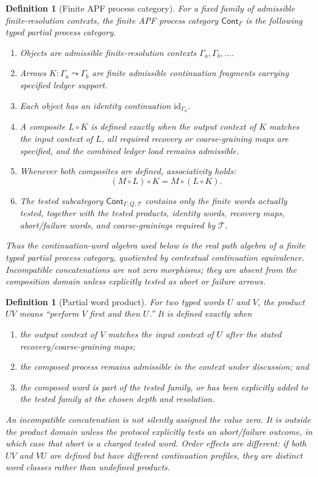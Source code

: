 \documentclass[11pt]{article}
\newtheorem{definition}[theorem]{Definition}
\begin{document}
\begin{definition}[Finite APF process category]\label{def:finite-apf-process-category}
For a fixed family of admissible finite-resolution contexts, the finite APF process category \(\mathsf{Cont}_\Gamma\) is the following typed partial process category.
\begin{enumerate}[label=(\roman*),leftmargin=2em]
\item Objects are admissible finite-resolution contexts \(\Gamma_a,\Gamma_b,\ldots\).
\item Arrows \(K:\Gamma_a\leadsto\Gamma_b\) are finite admissible continuation fragments carrying specified ledger support.
\item Each object has an identity continuation \(\mathrm{id}_{\Gamma_a}\).
\item A composite \(L\circ K\) is defined exactly when the output context of \(K\) matches the input context of \(L\), all required recovery or coarse-graining maps are specified, and the combined ledger load remains admissible.
\item Whenever both composites are defined, associativity holds:
\[
  (M\circ L)\circ K=M\circ(L\circ K).
\]
\item The tested subcategory \(\mathsf{Cont}_{\Gamma,Q,\mathcal T}\) contains only the finite words actually tested, together with the tested products, identity words, recovery maps, abort/failure words, and coarse-grainings required by \(\mathcal T\).
\end{enumerate}
Thus the continuation-word algebra used below is the real path algebra of a finite typed partial process category, quotiented by contextual continuation equivalence.  Incompatible concatenations are not zero morphisms; they are absent from the composition domain unless explicitly tested as abort or failure arrows.
\end{definition}

\begin{definition}[Partial word product]\label{def:partial-word-product}
For two typed words $U$ and $V$, the product $UV$ means ``perform $V$ first and then $U$.''  It is defined exactly when
\begin{enumerate}[label=(\roman*),leftmargin=2em]
\item the output context of $V$ matches the input context of $U$ after the stated recovery/coarse-graining maps;
\item the composed process remains admissible in the context under discussion; and
\item the composed word is part of the tested family, or has been explicitly added to the tested family at the chosen depth and resolution.
\end{enumerate}
An incompatible concatenation is not silently assigned the value zero.  It is outside the product domain unless the protocol explicitly tests an abort/failure outcome, in which case that abort is a charged tested word.  Order effects are different: if both $UV$ and $VU$ are defined but have different continuation profiles, they are distinct word classes rather than undefined products.
\end{definition}
\end{document}
